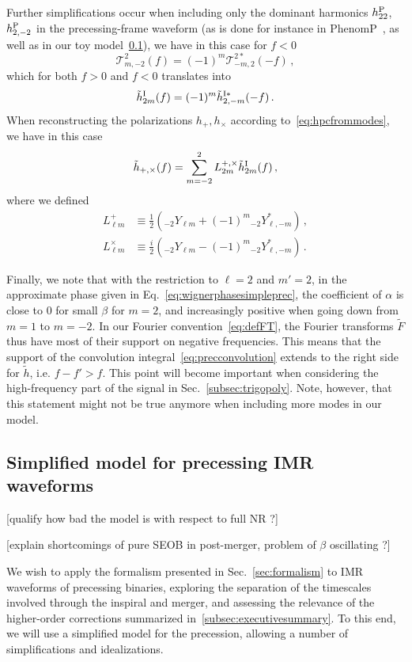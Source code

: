 \documentclass[aps,showpacs,twocolumn,
prd,superscriptaddress,nofootinbib]{revtex4-1}
\newcommand{\be}{\begin{equation}}
\newcommand{\ee}{\end{equation}}
\newcommand\calT{{\mathcal{T}}}
\newcommand{\nn}{\nonumber}
\newcommand{\SM}[1]{{\color{Red} #1}}
\begin{document}
Further simplifications occur when including only the dominant harmonics $h^{\rm P}_{22}$, $h^{\rm P}_{2,-2}$ in the precessing-frame waveform (as is done for instance in PhenomP~\cite{Hannam+13}, as well as in our toy model~\ref{subsec:precmodel}), we have in this case for $f<0$
\be
	\calT^{2}_{m,-2}(f) = (-1)^{m} \calT^{2 *}_{-m,2}(-f) \,,
\ee
which for both $f>0$ and $f<0$ translates into
\be\label{eq:symmetryhIfor22only}
	\tilde{h}^{\rm I}_{2 m}(f) = (-1)^{m} \tilde{h}^{\rm I *}_{2,-m}(-f) \,.
\ee
When reconstructing the polarizations $h_{+},h_{\times}$ according to~\eqref{eq:hpcfrommodes}, we have in this case
\be
	\tilde{h}_{+,\times} (f) = \sum_{m = -2}^{2} L^{+,\times}_{2 m} \tilde{h}^{\rm I}_{2 m}(f) \,,
\ee
where we defined
\begin{align}
	L^{+}_{\ell m} &\equiv \frac{1}{2} \left( {}_{-2}Y_{\ell m} + (-1)^{m} {}_{-2}Y_{\ell, -m}^{*} \right) \,, \nn\\
	L^{\times}_{\ell m} &\equiv \frac{i}{2} \left( {}_{-2}Y_{\ell m} - (-1)^{m} {}_{-2}Y_{\ell, -m}^{*} \right) \,.
\end{align}

Finally, we note that with the restriction to $\ell = 2$ and $m' = 2$, in the approximate phase given in Eq.~\eqref{eq:wignerphasesimpleprec}, the coefficient of $\alpha$ is close to $0$ for small $\beta$ for $m=2$, and increasingly positive when going down from $m=1$ to $m=-2$. In our Fourier convention~\eqref{eq:defFT}, the Fourier transforms $\tilde{F}$ thus have most of their support on negative frequencies. This means that the support of the convolution integral~\eqref{eq:precconvolution} extends to the right side for $\tilde{h}$, i.e. $f-f' > f$. This point will become important when considering the high-frequency part of the signal in Sec.~\ref{subsec:trigopoly}. Note, however, that this statement might not be true anymore when including more modes in our model.

\subsection{Simplified model for precessing IMR waveforms}
\label{subsec:precmodel}

\SM{[qualify how bad the model is with respect to full NR ?]}

\SM{[explain shortcomings of pure SEOB in post-merger, problem of $\beta$ oscillating ?]}

We wish to apply the formalism presented in Sec.~\ref{sec:formalism} to IMR waveforms of precessing binaries, exploring the separation of the timescales involved through the inspiral and merger, and assessing the relevance of the higher-order corrections summarized in~\ref{subsec:executivesummary}. To this end, we will use a simplified model for the precession, allowing a number of simplifications and idealizations.
\end{document}
